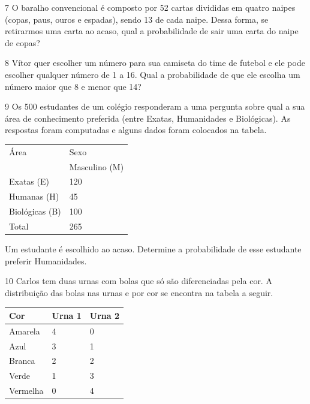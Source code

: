 
\pagebreak
\num{7} O baralho convencional é composto por 52 cartas divididas em quatro
naipes (copas, paus, ouros e espadas), sendo 13 de cada naipe. Dessa
forma, se retirarmos uma carta ao acaso, qual a probabilidade de sair
uma carta do naipe de copas?

\vspace{5cm}

\num{8} Vítor quer escolher um número para sua camiseta do time de futebol
e ele pode escolher qualquer número de 1 a 16. Qual a probabilidade de
que ele escolha um número maior que 8 e menor que 14?


\pagebreak
\num{9} Os 500 estudantes de um colégio responderam a uma pergunta sobre
qual a sua área de conhecimento preferida (entre Exatas, Humanidades e
Biológicas). As respostas foram computadas e alguns dados foram colocados
na tabela.

\begin{longtable}[]{@{}ll@{}}
\toprule
Área & Sexo\tabularnewline
& Masculino (M)\tabularnewline
Exatas (E) & 120\tabularnewline
Humanas (H) & 45\tabularnewline
Biológicas (B) & 100\tabularnewline
Total & 265\tabularnewline
\bottomrule
\end{longtable}

Um estudante é escolhido ao acaso. Determine a probabilidade de esse
estudante preferir Humanidades.

\vspace{2cm}

\num{10} Carlos tem duas urnas com bolas que só são diferenciadas pela
cor. A distribuição das bolas nas urnas e por cor se encontra na tabela
a seguir.

\begin{longtable}[]{@{}lll@{}}
\toprule
Cor & Urna 1 & Urna 2\tabularnewline
\midrule
\endhead
Amarela & 4 & 0\tabularnewline
Azul & 3 & 1\tabularnewline
Branca & 2 & 2\tabularnewline
Verde & 1 & 3\tabularnewline
Vermelha & 0 & 4\tabularnewline
\bottomrule
\end{longtable}

